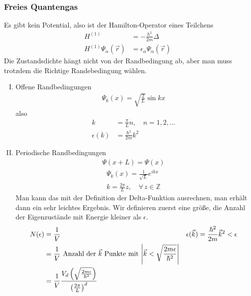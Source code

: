 \subsubsection*{Freies Quantengas}
Es gibt kein Potential, also ist der Hamilton-Operator eines Teilchens
%
\begin{align*}
  H^{(1)} & = - \frac{h^2}{2m} \Delta \\
  H^{(1)} \Psi_\alpha(\vec{r}) & = \epsilon_\alpha \Psi_\alpha (\vec{r})
\end{align*}
%
Die Zustandsdichte hängt nicht von der Randbedingung ab, aber man muss 
trotzdem die Richtige Randebedingung wählen.
\begin{enumerate}[I)]
  \item Offene Randbedingungen
    \begin{align*}
      \Psi_k(x) = \sqrt{\frac{2}{L}} \sin{k x}
    \end{align*}
    also
    \begin{align*}
      k & = \frac{\pi}{L}n, \quad n = 1, 2, \ldots \\
      \epsilon(k) & = \frac{\hbar^2}{2 m} k^2
    \end{align*}
  \item Periodische Randbedingungen
    \begin{align*}
      \Psi(x+L) = \Psi(x)
    \end{align*}
    \begin{align*}
      \Psi_k(x) = \frac{1}{\sqrt{L}} e^{i k x} \\
      k = \frac{2 \pi}{L} z, \quad\forall\,z \in \mathbb{Z}
    \end{align*}
    Man kann das mit der Definition der Delta-Funktion ausrechnen, man 
    erhält dann ein sehr leichtes Ergebnis. Wir definieren zuerst eine größe,
    die Anzahl der Eigenzustände mit Energie kleiner als $\epsilon$.
    \begin{align*}
      N(\epsilon) & = \frac{1}{V} & \epsilon(\vec{k}) = \frac{\hbar^2}{2m} \vec{k}^2 < \epsilon \\
                & = \frac{1}{V} \text{ Anzahl der $\vec{k}$ Punkte mit $\left| \vec{k} < \sqrt{\frac{2 m \epsilon}{ \hbar^2}} \right|$} \\
                  & = \frac{1}{V} \frac{V_d \left(\sqrt{\frac{2m\epsilon}{ \hbar^2}}\right) } 
      { \left( \frac{2 \pi}{L} \right)^d}
    \end{align*}


\end{enumerate}
